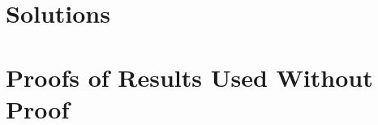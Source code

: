 \documentclass[12pt,a4paper]{memoir}
\begin{document}
    \begin{appendices}
    	\chapter{Solutions}
    	
        \chapter{Proofs of Results Used Without Proof}\label{proofs}
        
%       
%       
    \end{appendices}
\end{document}
